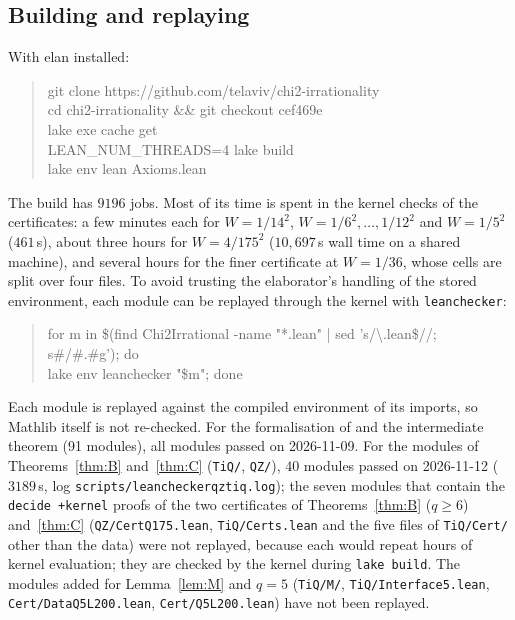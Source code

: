 \documentclass[11pt]{amsart}
\theoremstyle{definition}
\theoremstyle{remark}
\numberwithin{equation}{section}
\newcommand{\lean}[1]{{\def\_{\textunderscore\allowbreak}\texttt{#1}}}
\begin{document}
\subsection{Building and replaying}
With elan installed:
\begin{quote}\ttfamily\small
git clone https://github.com/telaviv/chi2-irrationality\\
cd chi2-irrationality \&\& git checkout cef469e\\
lake exe cache get\\
LEAN\_NUM\_THREADS=4 lake build\\
lake env lean Axioms.lean
\end{quote}
The build has $9196$ jobs. Most of its time is spent in the kernel checks of the certificates: a few minutes each for
$W=1/14^2$, $W=1/6^2,\dots,1/12^2$ and $W=1/5^2$ ($461$\,s), about three hours for $W=4/175^2$ ($10{,}697$\,s wall time on a shared machine), and
several hours for the finer certificate at $W=1/36$, whose cells are split over four files. To avoid trusting the
elaborator's handling of the stored environment, each module can be replayed through the kernel with \lean{leanchecker}:
\begin{quote}\ttfamily\small
for m in \$(find Chi2Irrational -name "*.lean" | sed 's/\textbackslash.lean\$//; s\#/\#.\#g'); do\\
\hspace*{2em}lake env leanchecker "\$m"; done
\end{quote}
Each module is replayed against the compiled environment of its imports, so Mathlib itself is not re-checked. For the
formalisation of \cite{Chi2Paper} and the intermediate theorem (91 modules), all modules passed on 2026-11-09. For the
modules of Theorems~\ref{thm:B} and~\ref{thm:C} (\lean{TiQ\slash{}}, \lean{QZ\slash{}}), $40$ modules passed on 2026-11-12
($3189$\,s, log \lean{scripts\slash{}leanchecker\_qz\_tiq.log}); the seven modules that contain the \lean{decide +kernel}
proofs of the two certificates of Theorems~\ref{thm:B} ($q\ge6$) and~\ref{thm:C} (\lean{QZ\slash{}CertQ175.lean}, \lean{TiQ\slash{}Certs.lean} and the five files of
\lean{TiQ\slash{}Cert\slash{}} other than the data) were not replayed, because each would repeat hours of kernel evaluation;
they are checked by the kernel during \lean{lake build}. The modules added for Lemma~\ref{lem:M} and $q=5$
(\lean{TiQ\slash{}M\slash{}}, \lean{TiQ\slash{}Interface5.lean}, \lean{Cert\slash{}DataQ5L200.lean}, \lean{Cert\slash{}Q5L200.lean}) have not
been replayed.
\end{document}
